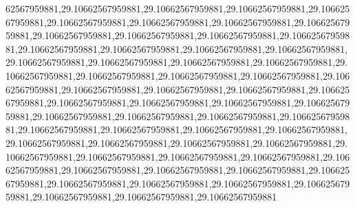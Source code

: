 62567959881,29.10662567959881,29.10662567959881,29.10662567959881,29.10662567959881,29.10662567959881,29.10662567959881,29.10662567959881,29.10662567959881,29.10662567959881,29.10662567959881,29.10662567959881,29.10662567959881,29.10662567959881,29.10662567959881,29.10662567959881,29.10662567959881,29.10662567959881,29.10662567959881,29.10662567959881,29.10662567959881,29.10662567959881,29.10662567959881,29.10662567959881,29.10662567959881,29.10662567959881,29.10662567959881,29.10662567959881,29.10662567959881,29.10662567959881,29.10662567959881,29.10662567959881,29.10662567959881,29.10662567959881,29.10662567959881,29.10662567959881,29.10662567959881,29.10662567959881,29.10662567959881,29.10662567959881,29.10662567959881,29.10662567959881,29.10662567959881,29.10662567959881,29.10662567959881,29.10662567959881,29.10662567959881,29.10662567959881,29.10662567959881,29.10662567959881,29.10662567959881,29.10662567959881,29.10662567959881,29.10662567959881,29.10662567959881,29.10662567959881,29.10662567959881,29.10662567959881,29.10662567959881,29.10662567959881,29.10662567959881,29.10662567959881
